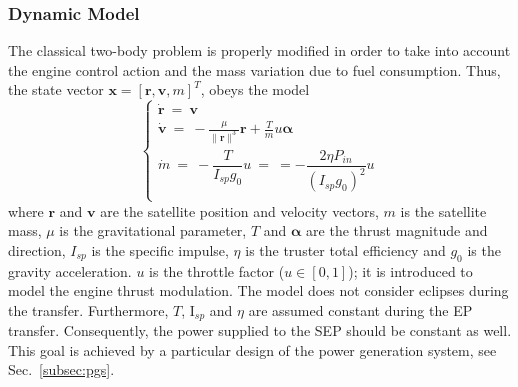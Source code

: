 \subsubsection{Dynamic Model}
\label{subsubsec:dynamicmodel}
The classical two-body problem is properly modified in order to take into account the engine control action and the mass variation due to fuel consumption.
Thus, the state vector $\mathbf{x}=[\mathbf{r}, \mathbf{v}, m]^T$, %
obeys the model 
%
\begin{equation}
\label{eq_kepler2bp}
\begin{cases}
\mathbf{\dot{r}}~=~\mathbf{v}\\
\mathbf{\dot{v}}~=~-\frac{\mu}{\parallel \mathbf{r} \parallel^3} \mathbf{r} + \frac{T}{m} u \boldsymbol{\alpha}\\
\dot{m}~= ~-\dfrac{T}{I_{sp} g_0} u~=~=-\dfrac{2 \eta  P_{in}}{\left(I_{sp} g_0\right)^2} u\\
\end{cases}
\end{equation}
%
where $\mathbf{r}$ and $\mathbf{v}$ are the satellite position and velocity vectors, $m$ is the satellite mass, $\mu$ is the gravitational parameter, $T$ and $\boldsymbol{\alpha}$ are the thrust magnitude and direction, $I_{sp}$ is the specific impulse, $\eta$ is the truster total efficiency and $g_0$ is the gravity acceleration. $u$ is the throttle factor ($u \in [0,1]$); it is introduced to model the engine thrust modulation. The model does not consider eclipses during the transfer. Furthermore, $T$, I${\scriptstyle{_{sp}}}$ and $\eta$ are assumed constant during the EP transfer. Consequently, the power supplied to the SEP should be constant as well. %
This goal is achieved by a particular design of the power generation system, see Sec.\ \ref{subsec:pgs}.

